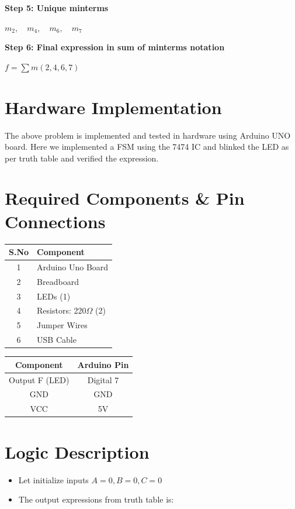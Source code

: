 \documentclass[a4paper,12pt]{article}
\begin{document}
\textbf{Step 5: Unique minterms}

$
m_2, \quad m_4, \quad m_6, \quad m_7
$

\textbf{Step 6: Final expression in sum of minterms notation}

$
f = \sum m(2, 4, 6, 7)
$

\section*{\textbf{Hardware Implementation}}
The above problem is implemented and tested in hardware using Arduino UNO board. Here we implemented a FSM using the 7474 IC and blinked the LED as per truth table and verified the expression.
\section*{Required Components \& Pin Connections}
\begin{center}
\begin{minipage}{0.45\textwidth}
\begin{table}[H]
\centering
\begin{tabular}{|c|l|}
\hline
\textbf{S.No} & \textbf{Component} \\ \hline
1 & Arduino Uno Board \\
2 & Breadboard \\
3 & LEDs (1) \\
4 & Resistors: 220$\Omega$ (2) \\
5 & Jumper Wires \\
6 & USB Cable \\
\hline
\end{tabular}
\end{table}
\end{minipage}
\hspace{0.05\textwidth}
\begin{minipage}{0.45\textwidth}
\begin{table}[H]
\centering
\begin{tabular}{|c|c|}
\hline
\textbf{Component} & \textbf{Arduino Pin} \\ \hline
Output F (LED) & Digital 7 \\
GND & GND \\
VCC & 5V \\
\hline
\end{tabular}
\end{table}
\end{minipage}
\end{center}
\section*{Logic Description}
\begin{itemize}
	\item Let initialize inputs $A=0,B=0,C=0$
	\item The output expressions from truth table is:
	\begin{multicols}{2}	
	\item $F=\bar{P}Q\bar{R}+P\bar{Q}\bar{R}+PQ\bar{R}+PQR$
	\end{multicols}
\end{itemize}
\end{document}

